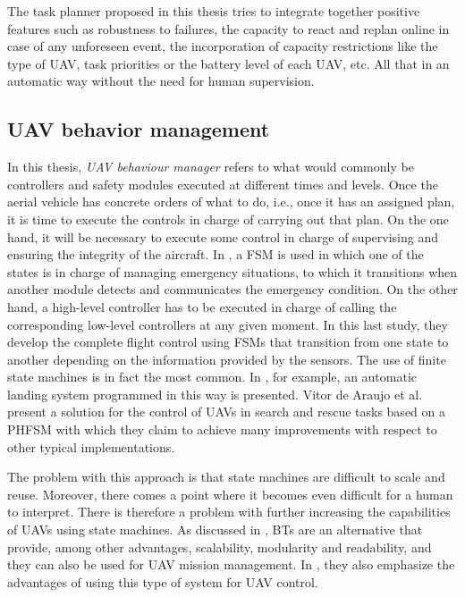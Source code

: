 The task planner proposed in this thesis tries to integrate together positive features such as robustness to failures, the capacity to react and replan online in case of any unforeseen event, the incorporation of capacity restrictions like the type of \gls{UAV}, task priorities or the battery level of each \gls{UAV}, etc. All that in an automatic way without the need for human supervision.

\subsection{\gls{UAV} behavior management}
\label{subsec:DroneBehaviorManagement}
In this thesis, \emph{\gls{UAV} behaviour manager} refers to what would commonly be controllers and safety modules executed at different times and levels. Once the aerial vehicle has concrete orders of what to do, i.e., once it has an assigned plan, it is time to execute the controls in charge of carrying out that plan. On the one hand, it will be necessary to execute some control in charge of supervising and ensuring the integrity of the aircraft. In \cite{monterrosa2016design}, a \gls{FSM} is used in which one of the states is in charge of managing emergency situations, to which it transitions when another module detects and communicates the emergency condition. On the other hand, a high-level controller has to be executed in charge of calling the corresponding low-level controllers at any given moment. In this last study, they develop the complete flight control using \glspl{FSM} that transition from one state to another depending on the information provided by the sensors. The use of finite state machines is in fact the most common. In \cite{kugler2017autoland}, for example, an automatic landing system programmed in this way is presented. Vitor de Araujo et al. \cite{de2014parallel} present a solution for the control of UAVs in search and rescue tasks based on a \gls{PHFSM} with which they claim to achieve many improvements with respect to other typical implementations.

The problem with this approach is that state machines are difficult to scale and reuse. Moreover, there comes a point where it becomes even difficult for a human to interpret. There is therefore a problem with further increasing the capabilities of \glspl{UAV} using state machines. As discussed in \cite{klockner2013behavior}, \glspl{BT} are an alternative that provide, among other advantages, scalability, modularity and readability, and they can also be used for \gls{UAV} mission management. In \cite{ogren2012increasing}, they also emphasize the advantages of using this type of system for \gls{UAV} control.

